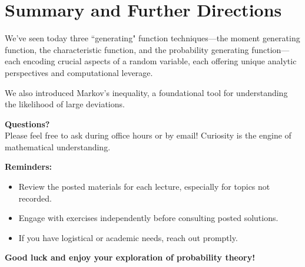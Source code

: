 \documentclass[12pt]{article}
\newenvironment{administrative_note}
  {\begin{center}\begin{Sbox}\begin{minipage}{0.9\textwidth}\small\textbf{Administrative Information:}\par}
  {\end{minipage}\end{Sbox}\fbox{\TheSbox}\end{center}}
\begin{document}
\section{Summary and Further Directions}

We've seen today three ``generating" function techniques---the moment generating function, the characteristic function, and the probability generating function---each encoding crucial aspects of a random variable, each offering unique analytic perspectives and computational leverage.

We also introduced Markov's inequality, a foundational tool for understanding the likelihood of large deviations.

\begin{center}
    \vspace{2em}
    \Large
    \textbf{Questions?}\\
    \large
    Please feel free to ask during office hours or by email! Curiosity is the engine of mathematical understanding.
\end{center}

\begin{administrative_note}
\textbf{Reminders:}
\begin{itemize}[leftmargin=1.7em]
    \item Review the posted materials for each lecture, especially for topics not recorded.
    \item Engage with exercises independently before consulting posted solutions.
    \item If you have logistical or academic needs, reach out promptly.
\end{itemize}
\textbf{Good luck and enjoy your exploration of probability theory!}
\end{administrative_note}
\end{document}
